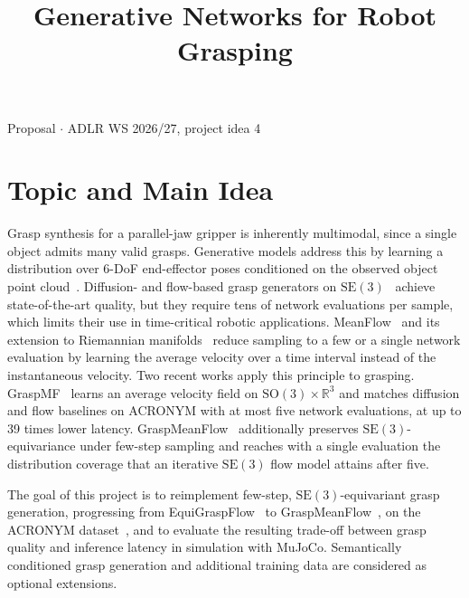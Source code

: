 \documentclass[conference]{IEEEtran}
\newcommand{\SO}{\mathrm{SO}(3)}
\newcommand{\SE}{\mathrm{SE}(3)}
\begin{document}
\title{Generative Networks for Robot Grasping}

\author{
  \and
}

\maketitle

\begin{center}
  \small Proposal $\cdot$ ADLR WS 2026/27, project idea 4
\end{center}

\section{Topic and Main Idea}

Grasp synthesis for a parallel-jaw gripper is inherently multimodal, since a single object admits many valid
grasps. Generative models address this by learning a distribution over 6-DoF end-effector poses conditioned on the
observed object point cloud~\cite{eppner2021acronym,winkelbauer2022twostage}. Diffusion- and flow-based grasp
generators on $\SE$~\cite{urain2023se3dif,lim2024equigraspflow} achieve state-of-the-art quality, but they require
tens of network evaluations per sample, which limits their use in time-critical robotic applications.
MeanFlow~\cite{geng2025meanflow} and its extension to Riemannian manifolds~\cite{woo2026riemannianmeanflow} reduce
sampling to a few or a single network evaluation by learning the average velocity over a time interval instead of
the instantaneous velocity. Two recent works apply this principle to grasping. GraspMF~\cite{bukhari2026graspmf}
learns an average velocity field on $\SO \times \mathbb{R}^3$ and matches diffusion and flow baselines on ACRONYM
with at most five network evaluations, at up to 39 times lower latency. GraspMeanFlow~\cite{kwon2026graspmeanflow}
additionally preserves $\SE$-equivariance under few-step sampling and reaches with a single evaluation the
distribution coverage that an iterative $\SE$ flow model attains after five.

The goal of this project is to reimplement few-step, $\SE$-equivariant grasp generation, progressing from
EquiGraspFlow~\cite{lim2024equigraspflow} to GraspMeanFlow~\cite{kwon2026graspmeanflow}, on the ACRONYM
dataset~\cite{eppner2021acronym}, and to evaluate the resulting trade-off between grasp quality and inference
latency in simulation with MuJoCo. Semantically conditioned grasp generation and additional training data are
considered as optional extensions.
\end{document}
